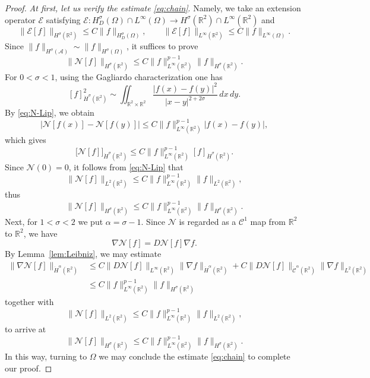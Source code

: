 \documentclass[a4paper,11pt]{article} %
\theoremstyle{remark}
\theoremstyle{definition}
\numberwithin{equation}{section}
\begin{document}
\begin{proof}
\textit{At first, let us verify the estimate \eqref{eq:chain}}. Namely, we take an extension operator \(\mathcal{E}\) satisfying $\mathcal{E}:H^\sigma_D(\Omega)\cap L^\infty(\Omega)
\to
H^\sigma(\mathbb R^2)\cap L^\infty(\mathbb R^2)$ and
\[
\big\|\mathcal{E}[f]\big\|_{H^\sigma(\mathbb R^2)}
\le C\|f\|_{H^\sigma_D(\Omega)},
\qquad
\big\|\mathcal{E}[f]\big\|_{L^\infty(\mathbb R^2)}
\le C\|f\|_{L^\infty(\Omega)}.
\]
Since $\|f\|_{H^\sigma(\mathcal{A})}
\sim
\|f\|_{H^\sigma(\Omega)}$, it suffices to prove
$$
\big\|\mathcal{N}[f]\big\|_{H^\sigma(\mathbb R^2)}
\le
C
\|f\|_{L^\infty(\mathbb R^2)}^{p-1}
\|f\|_{H^\sigma(\mathbb R^2)}.$$
For $0<\sigma<1$, using the Gagliardo characterization one has
$$
[f]_{\dot H^\sigma(\mathbb R^2)}^2
\sim
\iint_{\mathbb R^2\times\mathbb R^2}
\frac{|f(x)-f(y)|^2}{|x-y|^{2+2\sigma}}
\,dx\,dy.
$$
By \eqref{eq:N-Lip}, we obtain
$$
\big|\mathcal{N}[f(x)]-\mathcal{N}[f(y)]\big|
\le
C
\|f\|_{L^\infty(\mathbb R^2)}^{p-1}
|f(x)-f(y)|,
$$
which gives
$$
\big[\mathcal{N}[f]\big]_{\dot H^\sigma(\mathbb R^2)}
\le
C
\|f\|_{L^\infty(\mathbb R^2)}^{p-1}
[f]_{\dot H^\sigma(\mathbb R^2)}.
$$
Since $\mathcal{N}(0)=0$, it follows from \eqref{eq:N-Lip} that
$$
\big\|\mathcal{N}[f]\big\|_{L^2(\mathbb R^2)}
\le
C
\|f\|_{L^\infty(\mathbb R^2)}^{p-1}
\|f\|_{L^2(\mathbb R^2)},
$$
thus
$$
\big\|\mathcal{N}[f]\big\|_{H^\sigma(\mathbb R^2)}
\le
C
\|f\|_{L^\infty(\mathbb R^2)}^{p-1}
\|f\|_{H^\sigma(\mathbb R^2)}.
$$
Next, for $1<\sigma<2$ we put $\alpha=\sigma-1$. Since $\mathcal{N}$ is regarded as a $\mathcal{C}^1$ map from $\mathbb R^2$ to $\mathbb R^2$, we have
$$
\nabla \mathcal{N}[f] = D\mathcal{N}[f]\nabla f.
$$
By Lemma~\ref{lem:Leibniz}, we may estimate
\begin{align*}
\big\|\nabla \mathcal{N}[f]\big\|_{\dot H^\alpha(\mathbb R^2)}
&\le
C
\big\|D\mathcal{N}[f]\big\|_{L^\infty(\mathbb R^2)}
\|\nabla f\|_{\dot H^\alpha(\mathbb R^2)}
+
C
\big\|D\mathcal{N}[f]\big\|_{\dot{\mathcal{C}}^\alpha(\mathbb R^2)}
\|\nabla f\|_{L^2(\mathbb R^2)} \\
&\le
C
\|f\|_{L^\infty(\mathbb R^2)}^{p-1}
\|f\|_{H^\sigma(\mathbb R^2)}
\end{align*}
together with
$$
\big\|\mathcal{N}[f]\big\|_{L^2(\mathbb R^2)}
\le
C
\|f\|_{L^\infty(\mathbb R^2)}^{p-1}
\|f\|_{L^2(\mathbb R^2)},
$$
to arrive at
$$
\big\|\mathcal{N}[f]\big\|_{H^\sigma(\mathbb R^2)}
\le
C
\|f\|_{L^\infty(\mathbb R^2)}^{p-1}
\|f\|_{H^\sigma(\mathbb R^2)}.
$$
In this way, turning to $\Omega$ we may conclude the estimate \eqref{eq:chain} to complete our proof. \medskip


\end{proof}
\end{document}
